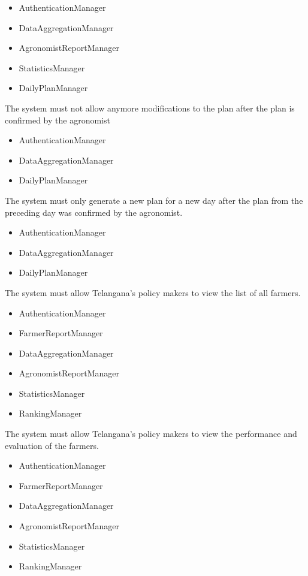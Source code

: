 \begin{itemize}
\begin{itemize}
\item AuthenticationManager
\item DataAggregationManager
\item AgronomistReportManager
\item StatisticsManager
\item DailyPlanManager

\end{itemize}

 The system must not allow anymore modifications to the plan after the plan is confirmed by the agronomist
\begin{itemize}

\item AuthenticationManager
\item DataAggregationManager
\item DailyPlanManager

\end{itemize}

 The system must only generate a new plan for a new day after the plan from the preceding day was confirmed by the agronomist.
\begin{itemize}

\item AuthenticationManager
\item DataAggregationManager
\item DailyPlanManager

\end{itemize}
 The system must allow Telangana’s policy makers to view the list of all farmers.
\begin{itemize}

\item AuthenticationManager
\item FarmerReportManager
\item DataAggregationManager
\item AgronomistReportManager
\item StatisticsManager
\item RankingManager

\end{itemize}
 The system must allow Telangana’s policy makers to view the performance and evaluation of the farmers.
\begin{itemize}

\item AuthenticationManager
\item FarmerReportManager
\item DataAggregationManager
\item AgronomistReportManager
\item StatisticsManager
\item RankingManager



\end{itemize}
\end{itemize}
